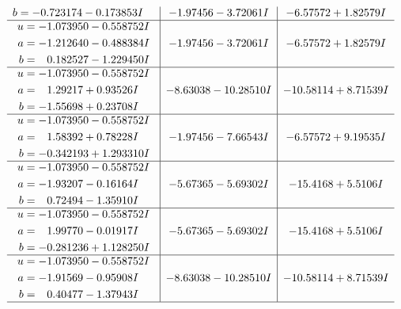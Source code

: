 \documentclass[1p]{elsarticle_modified}
\theoremstyle{definition}
\begin{document}
$$\begin{array}{c|c|c}
\begin{aligned}
b &= -0.723174 - 0.173853 I\end{aligned}
 & -1.97456 - 3.72061 I & -6.57572 + 1.82579 I \\ \hline\begin{aligned}
u &= -1.073950 - 0.558752 I \\
a &= -1.212640 - 0.488384 I \\
b &= \phantom{-}0.182527 - 1.229450 I\end{aligned}
 & -1.97456 - 3.72061 I & -6.57572 + 1.82579 I \\ \hline\begin{aligned}
u &= -1.073950 - 0.558752 I \\
a &= \phantom{-}1.29217 + 0.93526 I \\
b &= -1.55698 + 0.23708 I\end{aligned}
 & -8.63038 - 10.28510 I & -10.58114 + 8.71539 I \\ \hline\begin{aligned}
u &= -1.073950 - 0.558752 I \\
a &= \phantom{-}1.58392 + 0.78228 I \\
b &= -0.342193 + 1.293310 I\end{aligned}
 & -1.97456 - 7.66543 I & -6.57572 + 9.19535 I \\ \hline\begin{aligned}
u &= -1.073950 - 0.558752 I \\
a &= -1.93207 - 0.16164 I \\
b &= \phantom{-}0.72494 - 1.35910 I\end{aligned}
 & -5.67365 - 5.69302 I & -15.4168 + 5.5106 I \\ \hline\begin{aligned}
u &= -1.073950 - 0.558752 I \\
a &= \phantom{-}1.99770 - 0.01917 I \\
b &= -0.281236 + 1.128250 I\end{aligned}
 & -5.67365 - 5.69302 I & -15.4168 + 5.5106 I \\ \hline\begin{aligned}
u &= -1.073950 - 0.558752 I \\
a &= -1.91569 - 0.95908 I \\
b &= \phantom{-}0.40477 - 1.37943 I\end{aligned}
 & -8.63038 - 10.28510 I & -10.58114 + 8.71539 I\\
 \hline 
 \end{array}$$\newpage$$\begin{array}{c|c|c}  

\end{array}$$
\end{document}
